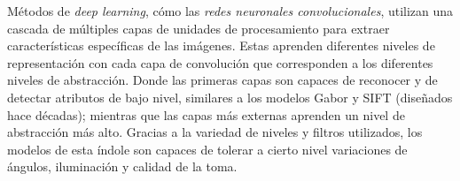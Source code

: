 \documentclass[letterpaper, 10 pt, conference]{ieeeconf}  %
\begin{document}
    Métodos de \textit{deep learning}, cómo las \textit{redes neuronales convolucionales},
    utilizan una cascada de múltiples capas de unidades de procesamiento para extraer
    características específicas de las imágenes. Estas aprenden diferentes niveles de
    representación con cada capa de convolución que corresponden a los diferentes niveles
    de abstracción. Donde las primeras capas son capaces de reconocer y de detectar
    atributos de bajo nivel, similares a los modelos Gabor y SIFT (diseñados hace décadas);
    mientras que las capas más externas aprenden un nivel de abstracción más alto.
    Gracias a la variedad de niveles y filtros utilizados, los modelos de
    esta índole son capaces de tolerar a cierto nivel variaciones de ángulos,
    iluminación y calidad de la toma. \cite{Wang2021}
\end{document}
